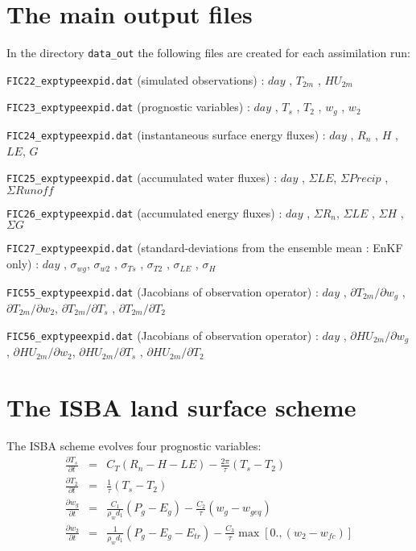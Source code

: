 \documentclass[12pt]{article}
\newcommand{\pd}[2]{\frac{\partial #1}{\partial #2}}
\begin{document}
\section{The main output files}
In the directory {\tt data\_out} the following files are created for each assimilation run:
\begin{description}
\item {\tt FIC22\_exptypeexpid.dat} (simulated observations) : $day$ , $T_{2m}$ , $HU_{2m}$ 
\item {\tt FIC23\_exptypeexpid.dat} (prognostic variables) : $day$ , $T_s$ , $T_2$ , $w_g$ , $w_2$
\item {\tt FIC24\_exptypeexpid.dat} (instantaneous surface energy fluxes) : $day$ , $R_n$ , $H$ , $LE$, $G$
\item {\tt FIC25\_exptypeexpid.dat} (accumulated water fluxes) : $day$ , $\Sigma LE$, $\Sigma Precip $ , $\Sigma Runoff$
\item {\tt FIC26\_exptypeexpid.dat} (accumulated energy fluxes) : $day$ , $\Sigma R_n$, $\Sigma LE $ , $\Sigma H$ , $\Sigma G$
\item {\tt FIC27\_exptypeexpid.dat} (standard-deviations from the ensemble mean : EnKF only) : $day$ , $\sigma_{wg}$, $\sigma_{w2}$ , $\sigma_{Ts}$ ,
$\sigma_{T2}$ , $\sigma_{LE}$ , $\sigma_{H}$ 
\item {\tt FIC55\_exptypeexpid.dat} (Jacobians of observation operator) : $day$ , $\partial T_{2m} / \partial w_g$ , $\partial T_{2m} / \partial w_2$,
$\partial T_{2m} / \partial T_s$ , $\partial T_{2m} / \partial T_2$ 
\item {\tt FIC56\_exptypeexpid.dat} (Jacobians of observation operator) : $day$ , $\partial HU_{2m} / \partial w_g$ , $\partial HU_{2m} / \partial w_2$,
$\partial HU_{2m} / \partial T_s$ , $\partial HU_{2m} / \partial T_2$
\end{description}
\section{The ISBA land surface scheme}
The ISBA scheme evolves four prognostic variables:
\begin{eqnarray}
\pd{T_s}{t} &=& C_T(R_n-H-LE) - \frac{2\pi}{\tau}(T_s-T_2)
\\
\pd{T_2}{t} &=& \frac{1}{\tau} (T_s - T_2)
\\
\pd{w_g}{t} &=& \frac{C_1}{\rho_w d_1}(P_g - E_g) - \frac{C_2}{\tau}(w_g - w_{geq})
\\
\pd{w_2}{t} &=& \frac{1}{\rho_w d_1}(P_g - E_g - E_{tr}) - \frac{C_3}{\tau}
\max\left[0.,(w_2 - w_{fc})\right]
\end{eqnarray}
\end{document}
